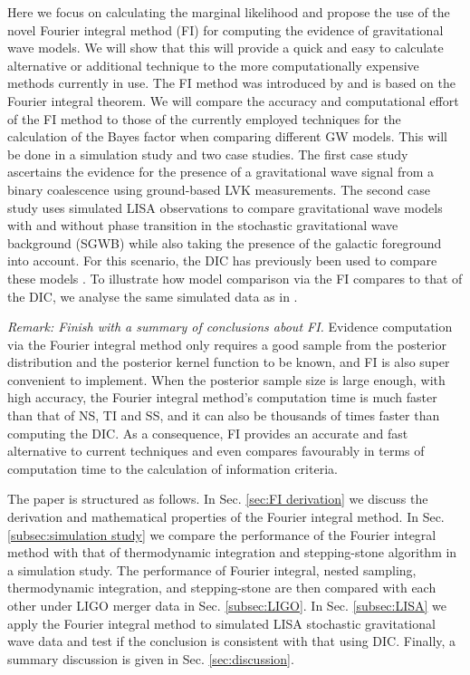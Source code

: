 \documentclass[%
 reprint,
 amsmath,amssymb,
 aps,
]{revtex4-2}
\begin{document}
Here we focus on calculating the marginal likelihood and propose the use of the novel Fourier integral method (FI) for computing the evidence of  gravitational wave models. We will show that this will provide a quick and easy to calculate alternative or additional technique to the more computationally expensive methods currently in use. 
The FI method was introduced by \cite{rotiroti2022computing} and is based on the Fourier integral theorem. We will compare the accuracy and computational effort of the FI method to those of the currently employed techniques for the calculation of the Bayes factor when comparing different GW models.
This will be done in a simulation study and two case studies. The first case study ascertains the evidence for the presence of a gravitational wave signal from a binary coalescence using ground-based LVK measurements. The second case study uses simulated LISA observations 
to compare gravitational wave models with and without phase transition in the stochastic gravitational wave background (SGWB) while also taking the presence of the galactic foreground into account. For this scenario,  the DIC has previously been used to compare these models \cite{BoileauGuillaume2023PfLt}. To illustrate how model comparison via the FI compares to that of the DIC, we analyse the same simulated data as in \cite{BoileauGuillaume2023PfLt}.

{\em Remark: Finish with a summary of conclusions about FI.}
Evidence computation via the Fourier integral method only requires a good sample from the posterior distribution and the posterior kernel function to be known, and FI is also super convenient to implement. When the posterior sample size is large enough, with high accuracy, the Fourier integral method's computation time is much faster than that of NS, TI and SS, and it can also be thousands of times faster than computing the DIC. As a consequence,
FI provides an accurate and fast alternative to current techniques and even compares favourably in terms of computation time to the calculation of information criteria.

The paper is structured as follows. In Sec. \ref{sec:FI derivation} we discuss the derivation and mathematical properties of the Fourier integral method. In Sec. \ref{subsec:simulation study} we compare the performance of the Fourier integral method with that of thermodynamic integration and stepping-stone algorithm in a simulation study. The performance of Fourier integral, nested sampling, thermodynamic integration, and stepping-stone are then compared with each other under LIGO merger data in Sec. \ref{subsec:LIGO}. In Sec. \ref{subsec:LISA} we apply the Fourier integral method to simulated LISA stochastic gravitational wave data and test if the conclusion is consistent with that using DIC. Finally, a summary discussion is given in Sec. \ref{sec:discussion}.
\end{document}
